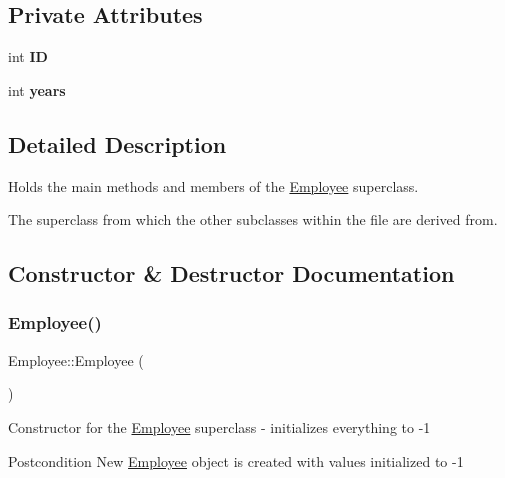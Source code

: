 \subsection*{Private Attributes}
\begin{DoxyCompactItemize}
\item 
\mbox{\label{classEmployee_a832bbae4ee8a704b917f82c4d497bbac}} 
int {\bfseries ID}
\item 
\mbox{\label{classEmployee_a3e4862d9dfc73becb459a562fa2e25f5}} 
int {\bfseries years}
\end{DoxyCompactItemize}


\subsection{Detailed Description}
Holds the main methods and members of the \hyperlink{classEmployee}{Employee} superclass. 

The superclass from which the other subclasses within the file are derived from. 

\subsection{Constructor \& Destructor Documentation}
\mbox{\label{classEmployee_a003c7bd08c40924e381eb0750cbb906f}} 
\subsubsection{\texorpdfstring{Employee()}{Employee()}\hspace{0.1cm}{\footnotesize\ttfamily [1/2]}}
{\footnotesize\ttfamily Employee\+::\+Employee (\begin{DoxyParamCaption}{ }\end{DoxyParamCaption})}

Constructor for the \hyperlink{classEmployee}{Employee} superclass -\/ initializes everything to -\/1

\begin{DoxyPostcond}{Postcondition}
New \hyperlink{classEmployee}{Employee} object is created with values initialized to -\/1 
\end{DoxyPostcond}
\mbox{\label{classEmployee_ad0c935ef9a290a82dcf7865172c90148}} 
